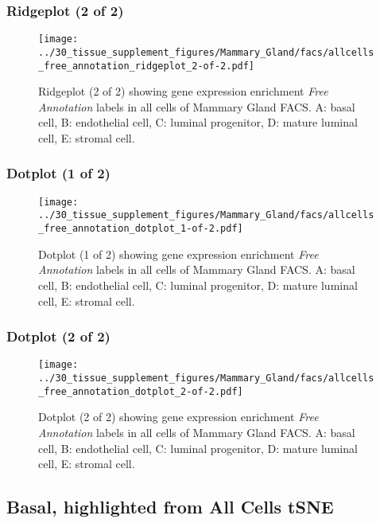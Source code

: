 \clearpage

\subsubsection{Ridgeplot (2 of 2)}
\begin{figure}[h]
\centering
\texttt{[image: ../30\_tissue\_supplement\_figures/Mammary\_Gland/facs/allcells\_free\_annotation\_ridgeplot\_2-of-2.pdf]}

\caption{ Ridgeplot (2 of 2)  showing gene expression enrichment \emph{Free Annotation} labels in all cells of Mammary Gland FACS. A: basal cell, B: endothelial cell, C: luminal progenitor, D: mature luminal cell, E: stromal cell.}
\end{figure}


\clearpage

\subsubsection{Dotplot (1 of 2)}
\begin{figure}[h]
\centering
\texttt{[image: ../30\_tissue\_supplement\_figures/Mammary\_Gland/facs/allcells\_free\_annotation\_dotplot\_1-of-2.pdf]}

\caption{ Dotplot (1 of 2)  showing gene expression enrichment \emph{Free Annotation} labels in all cells of Mammary Gland FACS. A: basal cell, B: endothelial cell, C: luminal progenitor, D: mature luminal cell, E: stromal cell.}
\end{figure}


\clearpage

\subsubsection{Dotplot (2 of 2)}
\begin{figure}[h]
\centering
\texttt{[image: ../30\_tissue\_supplement\_figures/Mammary\_Gland/facs/allcells\_free\_annotation\_dotplot\_2-of-2.pdf]}

\caption{ Dotplot (2 of 2)  showing gene expression enrichment \emph{Free Annotation} labels in all cells of Mammary Gland FACS. A: basal cell, B: endothelial cell, C: luminal progenitor, D: mature luminal cell, E: stromal cell.}
\end{figure}


\clearpage
\subsection{Basal, highlighted from All Cells tSNE}

